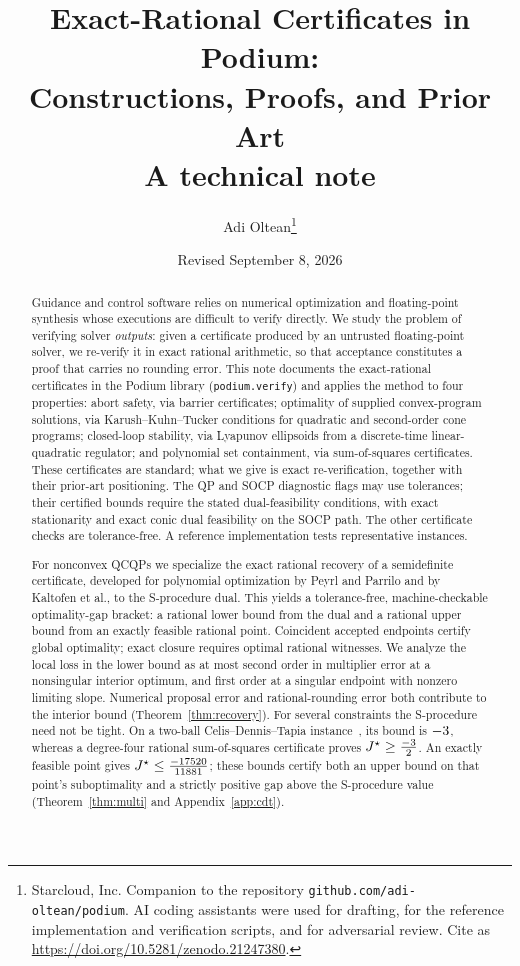 \documentclass[11pt]{article}
\title{Exact-Rational Certificates in Podium:\\
Constructions, Proofs, and Prior Art\\
{\large A technical note}}
\author{Adi Oltean\thanks{Starcloud, Inc. Companion to the repository
\texttt{github.com/adi-oltean/podium}. AI coding assistants were used for
drafting, for the reference implementation and verification scripts, and for
adversarial review. Cite as
\url{https://doi.org/10.5281/zenodo.21247380}.}}
\date{Revised September 8, 2026}
\theoremstyle{plain}
\theoremstyle{remark}
\begin{document}
\maketitle

\begin{abstract}
Guidance and control software relies on numerical optimization and
floating-point synthesis whose executions are difficult to verify directly. We
study the problem of verifying solver \emph{outputs}: given a certificate
produced by an untrusted floating-point solver, we re-verify it in exact rational
arithmetic, so that acceptance constitutes a proof that carries no rounding
error. This note documents the exact-rational certificates in the Podium library
(\texttt{podium.verify}) and applies the method to four properties: abort safety,
via barrier certificates; optimality of supplied convex-program solutions, via
Karush--Kuhn--Tucker conditions for quadratic and second-order cone programs;
closed-loop stability, via Lyapunov ellipsoids from a discrete-time
linear-quadratic regulator; and polynomial set containment, via sum-of-squares
certificates. These certificates are standard; what we give is exact
re-verification, together with their prior-art positioning.
The QP and SOCP diagnostic flags may use tolerances; their certified bounds
require the stated dual-feasibility conditions, with exact stationarity and
exact conic dual feasibility on the SOCP path. The other certificate checks
are tolerance-free. A reference implementation tests representative instances.

For nonconvex QCQPs we specialize the exact rational recovery of a semidefinite
certificate, developed for polynomial optimization by Peyrl and Parrilo and by
Kaltofen et al., to the S-procedure dual. This yields a tolerance-free,
machine-checkable optimality-gap bracket: a rational lower bound from the dual
and a rational upper bound from an exactly feasible rational point. Coincident
accepted endpoints certify global optimality; exact closure requires optimal
rational witnesses. We analyze the local loss in the lower bound as
at most second order in multiplier error at a nonsingular interior optimum, and first
order at a singular endpoint with nonzero limiting slope. Numerical proposal
error and rational-rounding error both contribute to the interior bound
(Theorem~\ref{thm:recovery}). For several constraints the
S-procedure need not be tight. On a two-ball Celis--Dennis--Tapia instance~\cite{celis1985}, its
bound is $-3$, whereas a degree-four rational sum-of-squares
certificate proves $J^\star\ge\frac{-3}{2}$. An exactly feasible point gives
$J^\star\le\frac{-17520}{11881}$; these bounds certify both an upper bound on that
point's suboptimality and a strictly positive gap above the S-procedure value
(Theorem~\ref{thm:multi} and Appendix~\ref{app:cdt}).
\end{abstract}
\end{document}

